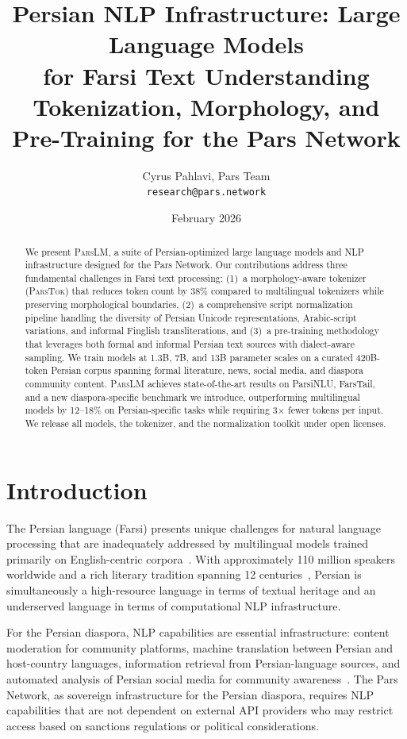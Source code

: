 \documentclass[11pt,a4paper]{article}
\title{Persian NLP Infrastructure: Large Language Models\\for Farsi Text Understanding\\[0.5em]
\large Tokenization, Morphology, and Pre-Training for the Pars Network}
\author{
  Cyrus Pahlavi, Pars Team\\
  \texttt{research@pars.network}
}
\date{February 2026}
\newcommand{\parslm}{\textsc{ParsLM}\xspace}
\newcommand{\parstok}{\textsc{ParsTok}\xspace}
\begin{document}
\parscoverpage


\begin{abstract}
We present \parslm, a suite of Persian-optimized large language models and NLP infrastructure designed for the Pars Network. Our contributions address three fundamental challenges in Farsi text processing: (1)~a morphology-aware tokenizer (\parstok) that reduces token count by 38\% compared to multilingual tokenizers while preserving morphological boundaries, (2)~a comprehensive script normalization pipeline handling the diversity of Persian Unicode representations, Arabic-script variations, and informal Finglish transliterations, and (3)~a pre-training methodology that leverages both formal and informal Persian text sources with dialect-aware sampling. We train models at 1.3B, 7B, and 13B parameter scales on a curated 420B-token Persian corpus spanning formal literature, news, social media, and diaspora community content. \parslm achieves state-of-the-art results on ParsiNLU, FarsTail, and a new diaspora-specific benchmark we introduce, outperforming multilingual models by 12--18\% on Persian-specific tasks while requiring 3$\times$ fewer tokens per input. We release all models, the tokenizer, and the normalization toolkit under open licenses.
\end{abstract}

\section{Introduction}

The Persian language (Farsi) presents unique challenges for natural language processing that are inadequately addressed by multilingual models trained primarily on English-centric corpora~\citep{conneau2020unsupervised,xue2021mt5}. With approximately 110 million speakers worldwide and a rich literary tradition spanning 12 centuries~\citep{windfuhr2009iranian}, Persian is simultaneously a high-resource language in terms of textual heritage and an underserved language in terms of computational NLP infrastructure.

For the Persian diaspora, NLP capabilities are essential infrastructure: content moderation for community platforms, machine translation between Persian and host-country languages, information retrieval from Persian-language sources, and automated analysis of Persian social media for community awareness~\citep{shafiee2021parsbert}. The Pars Network, as sovereign infrastructure for the Persian diaspora, requires NLP capabilities that are not dependent on external API providers who may restrict access based on sanctions regulations or political considerations.
\end{document}
